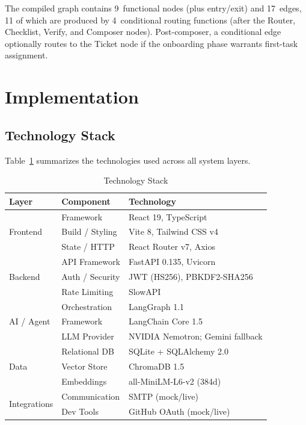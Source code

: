 \documentclass[conference]{IEEEtran}
\begin{document}
The compiled graph contains 9~functional nodes (plus entry/exit) and 17~edges, 11 of which are produced by 4~conditional routing functions (after the Router, Checklist, Verify, and Composer nodes). Post-composer, a conditional edge optionally routes to the Ticket node if the onboarding phase warrants first-task assignment.

\section{Implementation}

\subsection{Technology Stack}
Table~\ref{tab:techstack} summarizes the technologies used across all system layers.

\begin{table}[htbp]
\centering
\caption{Technology Stack}
\label{tab:techstack}
\begin{tabular}{l l l}
\toprule
\textbf{Layer} & \textbf{Component} & \textbf{Technology} \\
\midrule
\multirow{3}{*}{Frontend} & Framework & React 19, TypeScript \\
 & Build / Styling & Vite 8, Tailwind CSS v4 \\
 & State / HTTP & React Router v7, Axios \\
\midrule
\multirow{3}{*}{Backend} & API Framework & FastAPI 0.135, Uvicorn \\
 & Auth / Security & JWT (HS256), PBKDF2-SHA256 \\
 & Rate Limiting & SlowAPI \\
\midrule
\multirow{3}{*}{AI / Agent} & Orchestration & LangGraph 1.1 \\
 & Framework & LangChain Core 1.5 \\
 & LLM Provider & NVIDIA Nemotron; Gemini fallback \\
\midrule
\multirow{3}{*}{Data} & Relational DB & SQLite + SQLAlchemy 2.0 \\
 & Vector Store & ChromaDB 1.5 \\
 & Embeddings & all-MiniLM-L6-v2 (384d) \\
\midrule
\multirow{2}{*}{Integrations} & Communication & SMTP (mock/live) \\
 & Dev Tools & GitHub OAuth (mock/live) \\
\bottomrule
\end{tabular}
\end{table}
\end{document}
